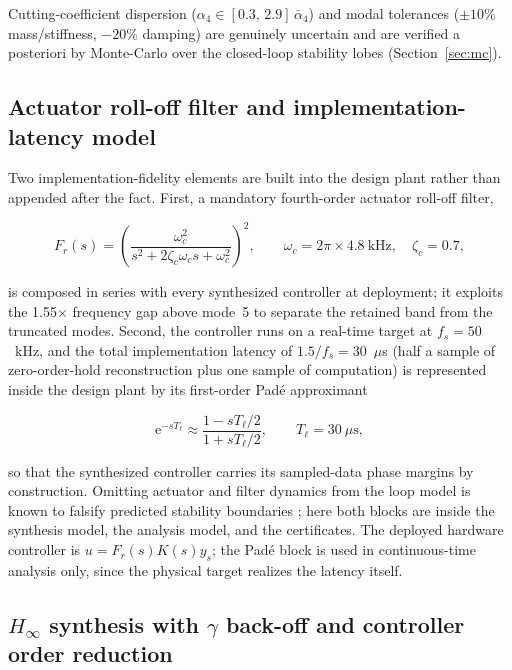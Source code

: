 \documentclass[preprint,12pt]{elsarticle}
\newcommand{\hinf}{H_\infty}
\begin{document}
Cutting-coefficient dispersion
($\alpha_4 \in [0.3,\, 2.9]\, \bar{\alpha}_4$) and modal tolerances
($\pm 10\%$ mass/stiffness, $-20\%$ damping) are genuinely uncertain and
are verified a posteriori by Monte-Carlo over the closed-loop stability
lobes (Section~\ref{sec:mc}).

\subsection{Actuator roll-off filter and implementation-latency model}
\label{sec:actuator}

Two implementation-fidelity elements are built into the design plant
rather than appended after the fact. First, a mandatory fourth-order
actuator roll-off filter,

\begin{equation}
\label{eq:rolloff}
F_r(s) = \left( \frac{\omega_c^2}{s^2 + 2 \zeta_c \omega_c s +
\omega_c^2} \right)^{2},
\qquad
\omega_c = 2\pi \times 4.8~\mathrm{kHz}, \quad \zeta_c = 0.7,
\end{equation}

is composed in series with every synthesized controller at deployment;
it exploits the 1.55$\times$ frequency gap above mode~5 to separate the
retained band from the truncated modes. Second, the controller runs on a
real-time target at $f_s = 50$~kHz, and the total implementation latency
of $1.5 / f_s = 30$~$\mu$s (half a sample of zero-order-hold
reconstruction plus one sample of computation) is represented inside the
design plant by its first-order Pad\'e approximant

\begin{equation}
\label{eq:pade}
\mathrm{e}^{-s T_\ell} \approx \frac{1 - s T_\ell / 2}{1 + s T_\ell / 2},
\qquad
T_\ell = 30~\mu\mathrm{s},
\end{equation}

so that the synthesized controller carries its sampled-data phase
margins by construction. Omitting actuator and filter dynamics from the
loop model is known to falsify predicted stability boundaries
\cite{lehotzky2021milling}; here both blocks are inside the synthesis
model, the analysis model, and the certificates. The deployed hardware
controller is $u = F_r(s) K(s) y_s$; the Pad\'e block is used in
continuous-time analysis only, since the physical target realizes the
latency itself.

\subsection{$\hinf$ synthesis with $\gamma$ back-off and controller
order reduction}
\label{sec:hinfsyn}
\end{document}
